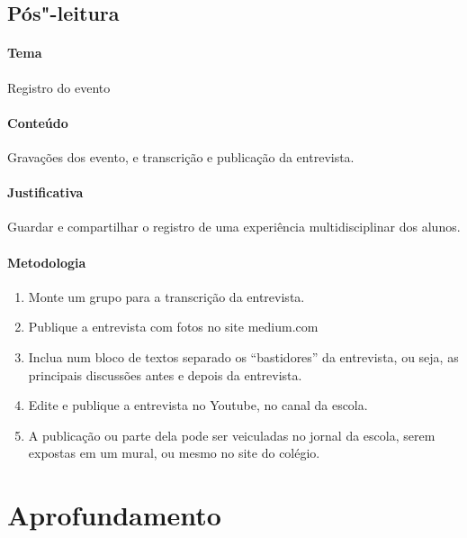 \documentclass[12pt]{extarticle}
\begin{document}
\subsection{Pós"-leitura}

\paragraph{Tema} Registro do evento

\paragraph{Conteúdo} Gravações dos evento, e transcrição e publicação da entrevista. 

\paragraph{Justificativa} Guardar e compartilhar o registro de uma experiência multidisciplinar 
	dos alunos. 

\paragraph{Metodologia}
	\begin{enumerate}
		\item Monte um grupo para a transcrição da entrevista. 
		\item Publique a entrevista com fotos no site medium.com
		\item Inclua num bloco de textos separado os ``bastidores'' da entrevista, ou seja, 
		as principais discussões antes e depois da entrevista. 
		\item Edite e publique a entrevista no Youtube, no canal da escola. 
		\item A publicação ou parte dela pode ser veiculadas no jornal da escola,
		serem expostas em um mural, ou mesmo no site do colégio.
	\end{enumerate}


\section{Aprofundamento}

\end{document}
